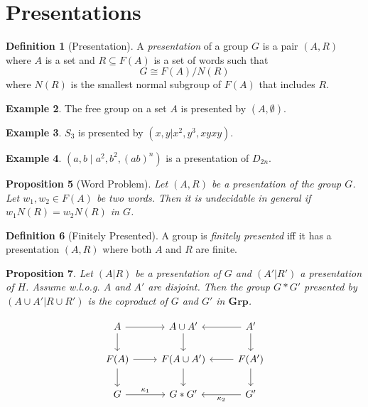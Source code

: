 \documentclass{book}
\newtheorem{prop}{Proposition}[chapter]
\theoremstyle{definition}
\newtheorem{df}[prop]{Definition}
\newtheorem{ex}[prop]{Example}
\begin{document}
\section{Presentations}

\begin{df}[Presentation]
A \emph{presentation} of a group $G$ is a pair $(A,R)$ where $A$ is a set and $R \subseteq F(A)$ is a set of words such that
\[ G \cong F(A) / N(R) \]
where $N(R)$ is the smallest normal subgroup of $F(A)$ that includes $R$.
\end{df}

\begin{ex}
The free group on a set $A$ is presented by $(A, \emptyset)$.
\end{ex}

\begin{ex}
$S_3$ is presented by $(x,y|x^2,y^3,xyxy)$.
\end{ex}

\begin{ex}
$(a,b \mid a^2, b^2, (ab)^n)$ is a presentation of $D_{2n}$.
\end{ex}

\begin{prop}[Word Problem]
Let $(A,R)$ be a presentation of the group $G$. Let $w_1, w_2 \in F(A)$ be two words. Then it is undecidable in general if $w_1N(R) = w_2N(R)$ in $G$.
\end{prop}

\begin{df}[Finitely Presented]
A group is \emph{finitely presented} iff it has a presentation $(A,R)$ where both $A$ and $R$ are finite.
\end{df}

\begin{prop}
Let $(A|R)$ be a presentation of $G$ and $(A'|R')$ a presentation of $H$. Assume w.l.o.g. $A$ and $A'$ are disjoint. Then the group $G * G'$ presented by $(A \cup A' | R \cup R')$ is the coproduct of $G$ and $G'$ in $\mathbf{Grp}$.
\end{prop}

\[ \begin{tikzcd}
A \arrow[d] \arrow[r] & A \cup A' \arrow[d] & A' \arrow[l] \arrow[d] \\
 F(A) \arrow[d] \arrow[r] & F(A \cup A') \arrow[d] & F(A') \arrow[l] \arrow[d] \\
G \arrow[r, "\kappa_1"] & G * G' & G' \arrow[l, "\kappa_2"]
\end{tikzcd} \]
\end{document}
